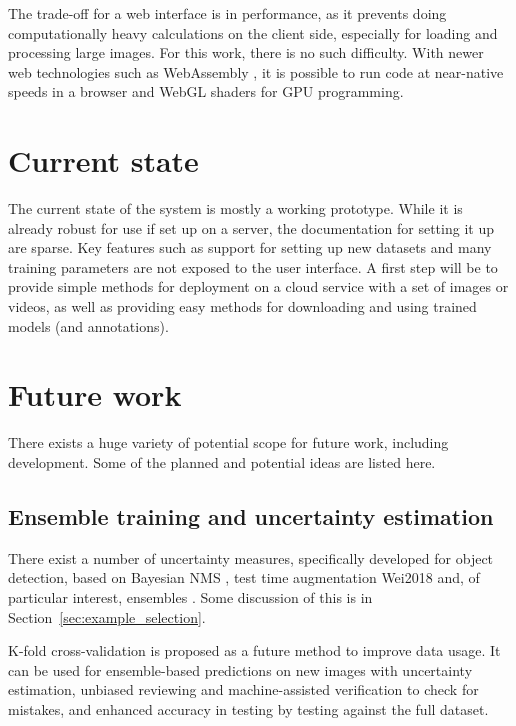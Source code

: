 The trade-off for a web interface is in performance, as it prevents doing computationally heavy calculations on the client side, especially for loading and processing large images. For this work, there is no such difficulty. With newer web technologies such as WebAssembly \cite{Haas2017}, it is possible to run code at near-native speeds in a browser and WebGL shaders for GPU programming.

\section{Current state}
\label{sec:current_state}

The current state of the system is mostly a working prototype. While it is already robust for use if set up on a server, the documentation for setting it up are sparse.  Key features such as support for setting up new datasets and many training parameters are not exposed to the user interface. A first step will be to provide simple methods for deployment on a cloud service with a set of images or videos, as well as providing easy methods for downloading and using trained models (and annotations).


\section{Future work}
\label{sec:design_future_work}

There exists a huge variety of potential scope for future work, including development. Some of the planned and potential ideas are listed here.

\subsection{Ensemble training and uncertainty estimation}

There exist a number of uncertainty measures, specifically developed for object detection, based on Bayesian \gls{NMS} \cite{Harakeh}, test time augmentation {Wei2018} and, of particular interest, ensembles \cite{Le2018}. Some discussion of this is in Section~\ref{sec:example_selection}. 

K-fold cross-validation is proposed as a future method to improve data usage. It can be used for ensemble-based predictions on new images with uncertainty estimation, unbiased reviewing and machine-assisted verification to check for mistakes, and enhanced accuracy in testing by testing against the full dataset.

